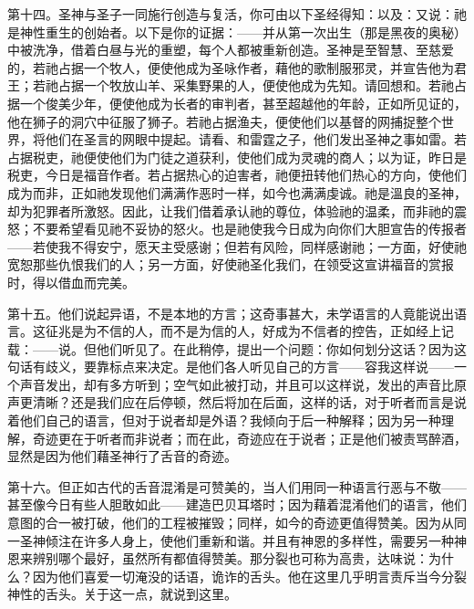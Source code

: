 第十四。圣神与圣子一同施行创造与复活，你可由以下圣经得知：以及：又说：祂是神性重生的创始者。以下是你的证据：——并从第一次出生（那是黑夜的奥秘）中被洗净，借着白昼与光的重塑，每个人都被重新创造。圣神是至智慧、至慈爱的，若祂占据一个牧人，便使他成为圣咏作者，藉他的歌制服邪灵，并宣告他为君王；若祂占据一个牧放山羊、采集野果的人，便使他成为先知。请回想和。若祂占据一个俊美少年，便使他成为长者的审判者，甚至超越他的年龄，正如所见证的，他在狮子的洞穴中征服了狮子。若祂占据渔夫，便使他们以基督的网捕捉整个世界，将他们在圣言的网眼中提起。请看、和雷霆之子，他们发出圣神之事如雷。若占据税吏，祂便使他们为门徒之道获利，使他们成为灵魂的商人；以为证，昨日是税吏，今日是福音作者。若占据热心的迫害者，祂便扭转他们热心的方向，使他们成为而非，正如祂发现他们满满作恶时一样，如今也满满虔诚。祂是溫良的圣神，却为犯罪者所激怒。因此，让我们借着承认祂的尊位，体验祂的温柔，而非祂的震怒；不要希望看见祂不妥协的怒火。也是祂使我今日成为向你们大胆宣告的传报者——若使我不得安宁，愿天主受感谢；但若有风险，同样感谢祂；一方面，好使祂宽恕那些仇恨我们的人；另一方面，好使祂圣化我们，在领受这宣讲福音的赏报时，得以借血而完美。\par

第十五。他们说起异语，不是本地的方言；这奇事甚大，未学语言的人竟能说出语言。这征兆是为不信的人，而不是为信的人，好成为不信者的控告，正如经上记载：——说。但他们听见了。在此稍停，提出一个问题：你如何划分这话？因为这句话有歧义，要靠标点来决定。是他们各人听见自己的方言——容我这样说——一个声音发出，却有多方听到；空气如此被打动，并且可以这样说，发出的声音比原声更清晰？还是我们应在后停顿，然后将加在后面，这样的话，对于听者而言是说着他们自己的语言，但对于说者却是外语？我倾向于后一种解释；因为另一种理解，奇迹更在于听者而非说者；而在此，奇迹应在于说者；正是他们被责骂醉酒，显然是因为他们藉圣神行了舌音的奇迹。\par

第十六。但正如古代的舌音混淆是可赞美的，当人们用同一种语言行恶与不敬——甚至像今日有些人胆敢如此——建造巴贝耳塔时；因为藉着混淆他们的语言，他们意图的合一被打破，他们的工程被摧毁；同样，如今的奇迹更值得赞美。因为从同一圣神倾注在许多人身上，使他们重新和谐。并且有神恩的多样性，需要另一种神恩来辨别哪个最好，虽然所有都值得赞美。那分裂也可称为高贵，达味说：为什么？因为他们喜爱一切淹没的话语，诡诈的舌头。他在这里几乎明言责斥当今分裂神性的舌头。关于这一点，就说到这里。\par

